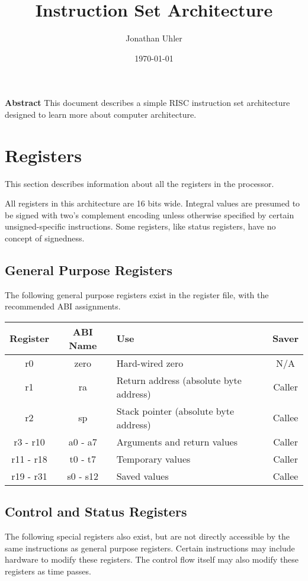 \documentclass{article}
\begin{document}
\title{Instruction Set Architecture}
\author{Jonathan Uhler}
\date{\today}
\maketitle

\textbf{Abstract}
This document describes a simple RISC instruction set architecture designed to learn more about
computer architecture.
\pagebreak


\section{Registers}
This section describes information about all the registers in the processor.

All registers in this architecture are 16 bits wide. Integral values are presumed to be signed with
two's complement encoding unless otherwise specified by certain unsigned-specific instructions.
Some registers, like status registers, have no concept of signedness.

\subsection{General Purpose Registers}
The following general purpose registers exist in the register file, with the recommended ABI
assignments.

\begin{tabular}{|cclc|}
  \hline
  Register & ABI Name & Use & Saver \\
  \hline
  r0 & zero & Hard-wired zero & N/A \\
  r1 & ra & Return address (absolute byte address) & Caller \\
  r2 & sp & Stack pointer (absolute byte address) & Callee \\
  r3 - r10 & a0 - a7 & Arguments and return values & Caller \\
  r11 - r18 & t0 - t7 & Temporary values & Caller \\
  r19 - r31 & s0 - s12 & Saved values & Callee \\
  \hline
\end{tabular}

\subsection{Control and Status Registers}
The following special registers also exist, but are not directly accessible by the same
instructions as general purpose registers. Certain instructions may include hardware to modify
these registers. The control flow itself may also modify these registers as time passes.
\end{document}
